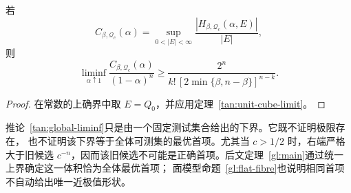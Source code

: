 \begin{corollary}[全体中心方体常数的严格下界]
\label{tan:global-liminf}
若
\[
 C_{\beta,\mathcal Q_c}(\alpha)=
 \sup_{0<|E|<\infty}\frac{|H_{\beta,\mathcal Q_c}(\alpha,E)|}{|E|},
\]
则
\begin{equation}
 \liminf_{\alpha\uparrow1}
 \frac{C_{\beta,\mathcal Q_c}(\alpha)}{(1-\alpha)^n}
 \ge\frac{2^n}{k!\,[2\min\{\beta,n-\beta\}]^{n-k}}.
 \label{tan:global-liminf-formula}
\end{equation}
\end{corollary}

\begin{proof}
在常数的上确界中取 $E=Q_0$，并应用定理~\ref{tan:unit-cube-limit}。
\end{proof}

\begin{remark}[首项的准确状态]
\label{tan:status}
推论~\ref{tan:global-liminf}只是由一个固定测试集合给出的下界。它既不证明极限存在，
也不证明该下界等于全体可测集的最优首项。尤其当 $c>1/2$ 时，右端严格大于旧候选
$c^{-n}$，因而该旧候选不可能是正确首项。后文定理~\ref{gl:main}通过统一上界确定这一体积恰为全体最优首项；
面模型命题~\ref{gl:flat-fibre}也说明相同首项不自动给出唯一近极值形状。
\end{remark}
